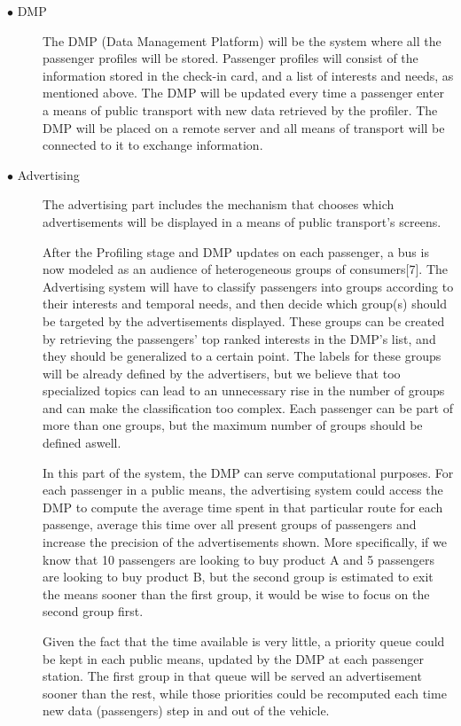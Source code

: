 \documentclass[letterpaper,11pt]{article}
\begin{document}
\begin{description}
 
 
 \newpage
\item[$\bullet$ DMP]

The DMP (Data Management Platform) will be the system where all the passenger profiles will be stored. Passenger profiles will consist of the information stored in the check-in card, and a list of interests and needs, as mentioned above. The DMP will be updated every time a passenger enter a means of public transport with new data retrieved by the profiler. The DMP will be placed on a remote server and all means of transport will be connected to it to exchange information.



\item[$\bullet$ Advertising]

The advertising part includes the mechanism that chooses which advertisements will be displayed in a means of public transport's screens. 

After the Profiling stage and DMP updates on each passenger, a bus is now modeled as an audience of heterogeneous groups of consumers[7]. The Advertising system will have to classify passengers into groups according to their interests and temporal needs, and then decide which group(s) should be targeted by the advertisements displayed. These groups can be created by retrieving the passengers' top ranked interests in the DMP's list, and they should be generalized to a certain point. The labels for these groups will be already defined by the advertisers, but we believe that too specialized topics can lead to an unnecessary rise in the number of groups and can make the classification too complex. Each passenger can be part of more than one groups, but the maximum number of groups should be defined aswell.

In this part of the system, the DMP can serve computational purposes. For each passenger in a public means, the advertising system could access the DMP to compute the average time spent in that particular route for each passenge, average this time over all present groups of passengers and increase the precision of the advertisements shown. More specifically, if we know that 10 passengers are looking to buy product A and 5 passengers are looking to buy product B, but the second group is estimated to exit the means sooner than the first group, it would be wise to focus on the second group first. 

Given the fact that the time available is very little, a priority queue could be kept in each public means, updated by the DMP at each passenger station. The first group in that queue will be served an advertisement sooner than the rest, while those priorities could be recomputed each time new data (passengers) step in and out of the vehicle.

\end{description}
\end{document}
